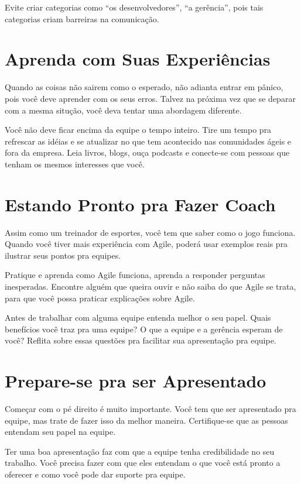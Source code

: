 \documentclass[a4paper, 10pt, font=plain]{abnt}
\begin{document}
Evite criar categorias como ``os desenvolvedores'', ``a gerência'', pois tais categorias criam barreiras na comunicação.

\section{Aprenda com Suas Experiências}
Quando as coisas não sairem como o esperado, não adianta entrar em pânico, pois você deve aprender com os seus erros. Talvez na próxima vez que se deparar com a mesma situção, você deva tentar uma abordagem diferente.

Você não deve ficar encima da equipe o tempo inteiro. Tire um tempo pra refrescar as idéias e se atualizar no que tem acontecido nas comunidades ágeis e fora da empresa. Leia livros, blogs, ouça podcasts e conecte-se com pessoas que tenham os mesmos interesses que você.


\section{Estando Pronto pra Fazer Coach}
Assim como um treinador de esportes, você tem que saber como o jogo funciona. Quando você tiver mais experiência com Agile, poderá usar exemplos reais pra ilustrar seus pontos pra equipes.

Pratique e aprenda como Agile funciona, aprenda a responder perguntas inesperadas. Encontre alguém que queira ouvir e não saiba do que Agile se trata, para que você possa praticar explicações sobre Agile.

Antes de trabalhar com alguma equipe entenda melhor o seu papel. Quais benefícios você traz pra uma equipe? O que a equipe e a gerência esperam de você? Reflita sobre essas questões pra facilitar sua apresentação pra equipe.


\section{Prepare-se pra ser Apresentado}
Começar com o pé direito é muito importante. Você tem que ser apresentado pra equipe, mas trate de fazer isso da melhor maneira. Certifique-se que as pessoas entendam seu papel na equipe.

Ter uma boa apresentação faz com que a equipe tenha credibilidade no seu trabalho. Você precisa fazer com que eles entendam o que você está pronto a oferecer e como você pode dar suporte pra equipe.
\end{document}
